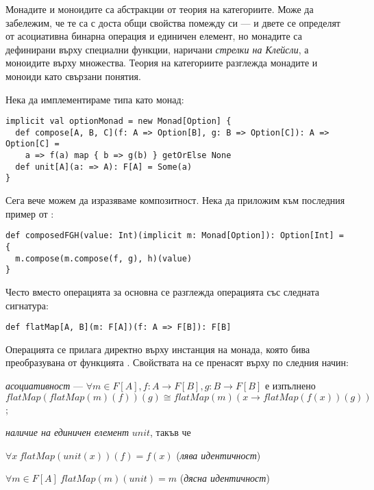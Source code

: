 Монадите и моноидите са абстракции от теория на категориите. Може да забележим, че те са с доста общи свойства помежду си — и двете се определят от асоциативна бинарна операция и единичен елемент, но монадите са дефинирани върху специални функции, наричани \emph{стрелки на Клейсли}, а моноидите върху множества. Теория на категориите разглежда монадите и моноиди като свързани понятия.

Нека да имплементираме типа  като монад:

\begin{lstlisting}
implicit val optionMonad = new Monad[Option] {
  def compose[A, B, C](f: A => Option[B], g: B => Option[C]): A => Option[C] =
    a => f(a) map { b => g(b) } getOrElse None
  def unit[A](a: => A): F[A] = Some(a)
}
\end{lstlisting}

Сега вече можем да изразяваме композитност. Нека да приложим  към последния пример от :

\begin{lstlisting}
def composedFGH(value: Int)(implicit m: Monad[Option]): Option[Int] = {
  m.compose(m.compose(f, g), h)(value)
}
\end{lstlisting}

Често вместо операцията  за основна се разглежда операцията  със следната сигнатура:

\begin{lstlisting}
def flatMap[A, B](m: F[A])(f: A => F[B]): F[B]
\end{lstlisting}

Операцията се прилага директно върху инстанция на монада, която бива преобразувана от функцията . Свойствата на  се пренасят върху  по следния начин:

\begin{itemize*}
  \item \emph{асоциативност} — $\forall m \in F[A], f: A \rightarrow F[B], g: B \rightarrow F[B]$ е изпълнено $flatMap(flatMap(m)(f))(g) \cong flatMap(m)(x \rightarrow flatMap(f(x))(g))$;
  \item \emph{наличие на единичен елемент} $unit$, такъв че
  \begin{itemize*}
    \item $\forall x~flatMap(unit(x))(f) = f(x)$ (\emph{лява идентичност})
    \item $\forall m \in F[A]~flatMap(m)(unit) = m$ (\emph{дясна идентичност})
  \end{itemize*}
\end{itemize*}

